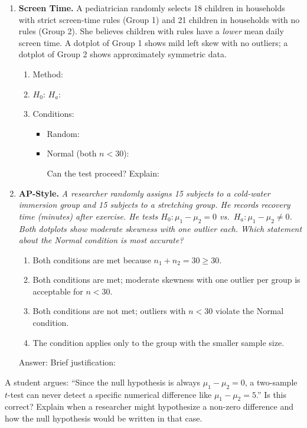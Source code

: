 \documentclass[10pt]{article}
\begin{document}
\begin{enumerate}
\item \textbf{Screen Time.} \quad
A pediatrician randomly selects 18 children in households with strict screen-time rules
(Group 1) and 21 children in households with no rules (Group 2). She believes children
with rules have a \emph{lower} mean daily screen time. A dotplot of Group 1 shows mild
left skew with no outliers; a dotplot of Group 2 shows approximately symmetric data.

\begin{enumerate}[label=\alph*.]
  \item Method: \blank{5.5cm}
  \item $H_0$: \blank{4.5cm} \quad $H_a$: \blank{4.5cm}
  \item Conditions:
        \begin{itemize}
          \item Random: \writeline
          \item Normal (both $n < 30$): \writeline

                Can the test proceed? \blank{1.5cm} \quad Explain: \writeline
        \end{itemize}
\end{enumerate}
\vspace{0.08in}

\item \textbf{AP-Style.} \quad
\textit{A researcher randomly assigns 15 subjects to a cold-water immersion group and
15 subjects to a stretching group. He records recovery time (minutes) after exercise.
He tests $H_0: \mu_1 - \mu_2 = 0$ vs.\ $H_a: \mu_1 - \mu_2 \ne 0$. Both dotplots
show moderate skewness with one outlier each. Which statement about the Normal condition
is most accurate?}

\begin{enumerate}[label=(\Alph*)]
  \item Both conditions are met because $n_1 + n_2 = 30 \ge 30$.
  \item Both conditions are met; moderate skewness with one outlier per group is acceptable for $n < 30$.
  \item Both conditions are not met; outliers with $n < 30$ violate the Normal condition.
  \item The condition applies only to the group with the smaller sample size.
\end{enumerate}
\vspace{0.04in}
Answer: \blank{1.5cm} \quad Brief justification: \writeline

\end{enumerate}

\begin{extensionbox}
A student argues: ``Since the null hypothesis is always $\mu_1 - \mu_2 = 0$, a two-sample
$t$-test can never detect a specific numerical difference like $\mu_1 - \mu_2 = 5$.''
Is this correct? Explain when a researcher might hypothesize a non-zero difference and
how the null hypothesis would be written in that case.
\end{extensionbox}
\end{document}
